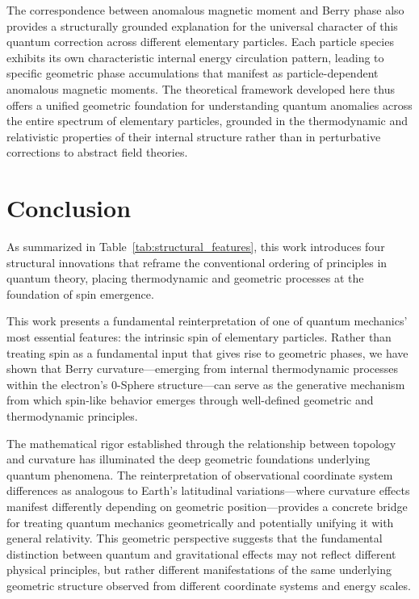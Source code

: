 \documentclass[%
 reprint,
 amsmath,amssymb,
 aps,
]{revtex4-1}
\numberwithin{equation}{section}%
\begin{document}
The correspondence between anomalous magnetic moment and Berry phase also provides a structurally grounded explanation for the universal character of this quantum correction across different elementary particles. Each particle species exhibits its own characteristic internal energy circulation pattern, leading to specific geometric phase accumulations that manifest as particle-dependent anomalous magnetic moments. The theoretical framework developed here thus offers a unified geometric foundation for understanding quantum anomalies across the entire spectrum of elementary particles, grounded in the thermodynamic and relativistic properties of their internal structure rather than in perturbative corrections to abstract field theories.

\clearpage

\section{Conclusion} \label{sec:conclusion}

As summarized in Table~\ref{tab:structural_features}, this work introduces four structural innovations that reframe the conventional ordering of principles in quantum theory, placing thermodynamic and geometric processes at the foundation of spin emergence.

This work presents a fundamental reinterpretation of one of quantum mechanics' most essential features: the intrinsic spin of elementary particles. Rather than treating spin as a fundamental input that gives rise to geometric phases, we have shown that Berry curvature—emerging from internal thermodynamic processes within the electron's 0-Sphere structure—can serve as the generative mechanism from which spin-like behavior emerges through well-defined geometric and thermodynamic principles.

The mathematical rigor established through the relationship between topology and curvature has illuminated the deep geometric foundations underlying quantum phenomena. The reinterpretation of observational coordinate system differences as analogous to Earth's latitudinal variations—where curvature effects manifest differently depending on geometric position—provides a concrete bridge for treating quantum mechanics geometrically and potentially unifying it with general relativity. This geometric perspective suggests that the fundamental distinction between quantum and gravitational effects may not reflect different physical principles, but rather different manifestations of the same underlying geometric structure observed from different coordinate systems and energy scales.
\end{document}
